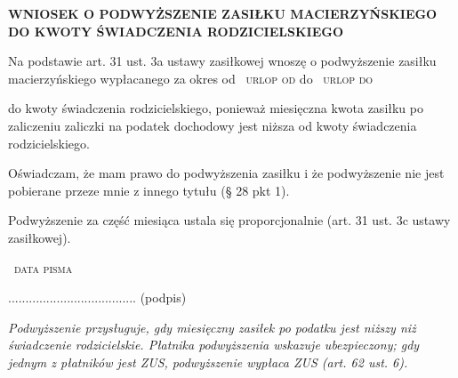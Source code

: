 \documentclass[11pt,a4paper]{article}
\newcommand{\Pole}[1]{%
  \textcolor{szary}{\dotfill}\,%
  {\scriptsize\textcolor{szary}{\textsc{#1}}}%
}
\newcommand{\NaglowekPisma}[1]{%
  \par\vspace{0.8em}%
  \begin{center}%
    {\large\bfseries\MakeUppercase{#1}}%
  \end{center}%
  \vspace{0.4em}%
}
\begin{document}
\NaglowekPisma{WNIOSEK O PODWYŻSZENIE ZASIŁKU MACIERZYŃSKIEGO DO KWOTY ŚWIADCZENIA RODZICIELSKIEGO}

Na podstawie art. 31 ust. 3a ustawy zasiłkowej wnoszę o podwyższenie
zasiłku macierzyńskiego wypłacanego za okres od \Pole{urlop od} do \Pole{urlop do}
do kwoty świadczenia rodzicielskiego, ponieważ miesięczna kwota zasiłku
po zaliczeniu zaliczki na podatek dochodowy jest niższa od kwoty
świadczenia rodzicielskiego.

Oświadczam, że mam prawo do podwyższenia zasiłku i że podwyższenie
nie jest pobierane przeze mnie z innego tytułu (\S{} 28 pkt 1).

Podwyższenie za część miesiąca ustala się proporcjonalnie
(art. 31 ust. 3c ustawy zasiłkowej).

\Pole{data pisma}
.....................................
(podpis)

\vfill
{\footnotesize\color{szary}\itshape Podwyższenie przysługuje, gdy miesięczny zasiłek po podatku jest niższy niż świadczenie rodzicielskie. Płatnika podwyższenia wskazuje ubezpieczony; gdy jednym z płatników jest ZUS, podwyższenie wypłaca ZUS (art. 62 ust. 6). }

\clearpage
\end{document}
